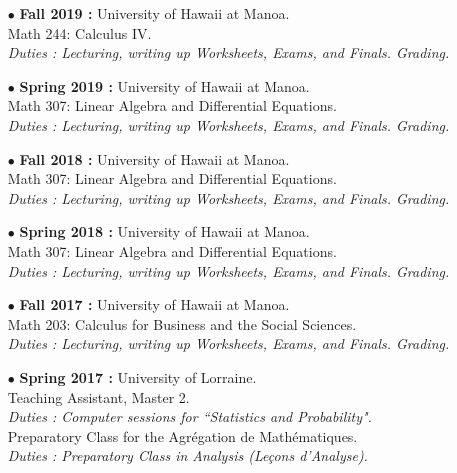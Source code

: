 \documentclass[a4paper]{article}
\begin{document}
\begin{itemize}

\item[$\bullet$] \textbf{ Fall 2019 :} University of Hawaii at Manoa.\\
					Math 244: Calculus IV.\\
					\textit{Duties : Lecturing, writing up Worksheets, Exams, and Finals. Grading.}\\

\item[$\bullet$] \textbf{ Spring 2019 :} University of Hawaii at Manoa.\\
					Math 307: Linear Algebra and Differential Equations.\\
					\textit{Duties : Lecturing, writing up Worksheets, Exams, and Finals. Grading.}\\

\item[$\bullet$] \textbf{ Fall 2018 :} University of Hawaii at Manoa.\\
					Math 307: Linear Algebra and Differential Equations.\\
					\textit{Duties : Lecturing, writing up Worksheets, Exams, and Finals. Grading.}\\

\item[$\bullet$] \textbf{ Spring 2018 :} University of Hawaii at Manoa.\\
					 Math 307: Linear Algebra and Differential Equations.\\
					\textit{Duties : Lecturing, writing up Worksheets, Exams, and Finals. Grading.}\\

\item[$\bullet$] \textbf{ Fall 2017 :} University of Hawaii at Manoa.\\
				 	Math 203: Calculus for Business and the Social Sciences.\\
					\textit{Duties : Lecturing, writing up Worksheets, Exams, and Finals. Grading.}\\

\item[$\bullet$] \textbf{ Spring 2017 :} University of Lorraine.\\
					Teaching Assistant, Master 2. \\
					\textit{Duties : Computer sessions for ``Statistics and Probability".}\\
					Preparatory Class for the Agrégation de Mathématiques.\\
					\textit{Duties : Preparatory Class in Analysis (Le\c{c}ons d'Analyse).}\\
	

\end{itemize}
\end{document}
